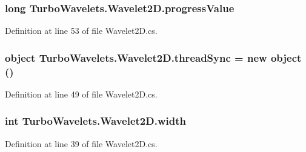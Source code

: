 \hypertarget{class_turbo_wavelets_1_1_wavelet2_d_ad2fad1f07e9e5c4901c0cdc925991e49}{
\subsubsection[{progress\+Value}]{\setlength{\rightskip}{0pt plus 5cm}long Turbo\+Wavelets.\+Wavelet2\+D.\+progress\+Value\hspace{0.3cm}{\ttfamily [protected]}}}\label{class_turbo_wavelets_1_1_wavelet2_d_ad2fad1f07e9e5c4901c0cdc925991e49}


Definition at line 53 of file Wavelet2\+D.\+cs.

\hypertarget{class_turbo_wavelets_1_1_wavelet2_d_ad69614eed43d939d02cf11076f95adee}{
\subsubsection[{thread\+Sync}]{\setlength{\rightskip}{0pt plus 5cm}object Turbo\+Wavelets.\+Wavelet2\+D.\+thread\+Sync = new object ()\hspace{0.3cm}{\ttfamily [protected]}}}\label{class_turbo_wavelets_1_1_wavelet2_d_ad69614eed43d939d02cf11076f95adee}


Definition at line 49 of file Wavelet2\+D.\+cs.

\hypertarget{class_turbo_wavelets_1_1_wavelet2_d_aaa4b3711957fe1798980e6891331a08d}{
\subsubsection[{width}]{\setlength{\rightskip}{0pt plus 5cm}int Turbo\+Wavelets.\+Wavelet2\+D.\+width\hspace{0.3cm}{\ttfamily [protected]}}}\label{class_turbo_wavelets_1_1_wavelet2_d_aaa4b3711957fe1798980e6891331a08d}


Definition at line 39 of file Wavelet2\+D.\+cs.



